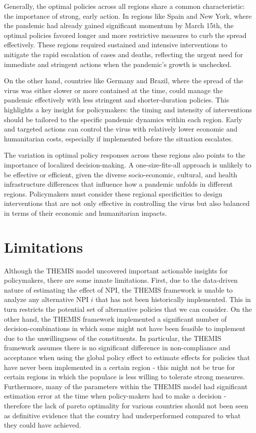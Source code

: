 \documentclass[msom,blindrev]{informs3} %
\begin{document}
Generally, the optimal policies across all regions share a common characteristic: the importance of strong, early action. In regions like Spain and New York, where the pandemic had already gained significant momentum by March 15th, the optimal policies favored longer and more restrictive measures to curb the spread effectively. These regions required sustained and intensive interventions to mitigate the rapid escalation of cases and deaths, reflecting the urgent need for immediate and stringent actions when the pandemic's growth is unchecked.

On the other hand, countries like Germany and Brazil, where the spread of the virus was either slower or more contained at the time, could manage the pandemic effectively with less stringent and shorter-duration policies. This highlights a key insight for policymakers: the timing and intensity of interventions should be tailored to the specific pandemic dynamics within each region. Early and targeted actions can control the virus with relatively lower economic and humanitarian costs, especially if implemented before the situation escalates.

The variation in optimal policy responses across these regions also points to the importance of localized decision-making. A one-size-fits-all approach is unlikely to be effective or efficient, given the diverse socio-economic, cultural, and health infrastructure differences that influence how a pandemic unfolds in different regions. Policymakers must consider these regional specificities to design interventions that are not only effective in controlling the virus but also balanced in terms of their economic and humanitarian impacts.

\section{Limitations}
\label{sec:discussion}
Although the THEMIS model uncovered important actionable insights for policymakers, there are some innate limitations. First, due to the data-driven nature of estimating the effect of NPI, the THEMIS framework is unable to analyze any alternative NPI $i$ that has not been historically implemented. This in turn restricts the potential set of alternative policies that we can consider. On the other hand, the THEMIS framework implemented a significant number of decision-combinations in which some might not have been feasible to implement due to the unwillingness of the constituents. In particular, the THEMIS framework assumes there is no significant difference in non-compliance and acceptance when using the global policy effect to estimate effects for policies that have never been implemented in a certain region - this might not be true for certain regions in which the populace is less willing to tolerate strong measures. Furthermore, many of the parameters within the THEMIS model had significant estimation error at the time when policy-makers had to make a decision - therefore the lack of pareto optimality for various countries should not been seen as definitive evidence that the country had underperformed compared to what they could have achieved. 
\end{document}

